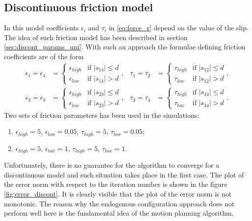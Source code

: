 \subsection{Discontinuous friction model}
In this model coefficients $\epsilon_i$ and $\tau_i$ in \eqref{eq:force_r} depend
on the value of the slip. The idea of such friction model has been described
in section \ref{sec:discont_params_uni}. With such an approach the formulae defining
friction coefficients are of the form
\begin{equation*}
\begin{aligned}
\epsilon_1=\epsilon_4&=\begin{cases}
\epsilon_{high} &\mbox{if } |s_{14}| \leq d \\
\epsilon_{low} &\mbox{if } |s_{14}| > d
\end{cases}, &
\tau_1=\tau_2&=\begin{cases}
\tau_{high} &\mbox{if } |s_{12}| \leq d \\
\tau_{low} &\mbox{if } |s_{12}| > d
\end{cases},\\
\epsilon_2=\epsilon_3&=\begin{cases}
\epsilon_{high} &\mbox{if } |s_{23}| \leq d \\
\epsilon_{low} &\mbox{if } |s_{23}| > d
\end{cases}, &
\tau_3=\tau_4&=\begin{cases}
\tau_{high} &\mbox{if } |s_{34}| \leq d \\
\tau_{low} &\mbox{if } |s_{34}| > d
\end{cases}.
\end{aligned}
\end{equation*}
Two sets of friction parameters has been used in the simulations:
\begin{enumerate}
\item $\epsilon_{high}=5$, $\epsilon_{low}=0.05$,
$\tau_{high}=5$, $\tau_{low}=0.05$;
\item $\epsilon_{high}=5$, $\epsilon_{low}=1$,
$\tau_{high}=5$, $\tau_{low}=1$.
\end{enumerate}
Unfortunately, there is no guarantee for the
algorithm to converge for a discontinuous model and such situation takes place in
the first case. The plot of the error norm with respect to the iteration number is shown
in the figure \ref{fig:error_discont}. It is clearly visible that the plot of the
error norm is not monotonic. The reason why the endogenous configuration approach
does not perform well here is the fundamental idea of the motion planning algorithm.
